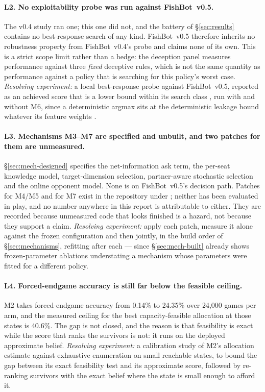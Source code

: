\documentclass[11pt]{article}
\theoremstyle{definition}
\DeclareRobustCommand{\vfive}{\texorpdfstring{\mbox{FishBot v0.5}}{FishBot v0.5}}
\DeclareRobustCommand{\vfour}{\texorpdfstring{\mbox{FishBot v0.4}}{FishBot v0.4}}
\providecommand{\numFeasibleRight}{40.6}
\providecommand{\numVfiveForcedAcc}{24.35}
\providecommand{\numVfourForcedAcc}{0.14}
\providecommand{\numForcedEightGames}{24{,}000}
\begin{document}
\paragraph{L2. No exploitability probe was run against \vfive{}.} The v0.4 study
ran one; this one did not, and the battery of \S\ref{sec:results} contains no
best-response search of any kind. \vfive{} therefore inherits no robustness
property from \vfour{}'s probe and claims none of its own. This is a strict
scope limit rather than a hedge: the deception panel measures performance against
three \emph{fixed} deceptive rules, which is not the same quantity as
performance against a policy that is searching for this policy's worst case.
\emph{Resolving experiment:} a local best-response probe against \vfive{},
reported as an achieved score that is a lower bound within its search class
\cite{lisy-lbr}, run with and without M6, since a deterministic argmax sits at
the deterministic leakage bound whatever its feature weights
\cite{alvim-leakage}.

\paragraph{L3. Mechanisms M3--M7 are specified and unbuilt, and two patches for
them are unmeasured.} \S\ref{sec:mech-designed} specifies the net-information ask
term, the per-seat knowledge model, target-dimension selection, partner-aware
stochastic selection and the online opponent model. None is on \vfive{}'s
decision path. Patches for M4/M5 and for M7 exist in the repository
under ; neither has been evaluated in play, and
no number anywhere in this report is attributable to either. They are recorded
because unmeasured code that looks finished is a hazard, not because they support
a claim. \emph{Resolving experiment:} apply each patch, measure it alone against
the frozen configuration and then jointly, in the build order of
\S\ref{sec:mechanisms}, refitting after each --- since
\S\ref{sec:mech-built} already shows frozen-parameter ablations understating a
mechanism whose parameters were fitted for a different policy.

\paragraph{L4. Forced-endgame accuracy is still far below the feasible
ceiling.} M2 takes forced-endgame accuracy from \numVfourForcedAcc\% to
\numVfiveForcedAcc\% over \numForcedEightGames{} games per arm, and the measured
ceiling for the best capacity-feasible allocation at those states is
\numFeasibleRight\%. The gap is not closed, and the reason is that feasibility
is exact while the score that ranks the survivors is not: it runs on the
deployed approximate belief. \emph{Resolving experiment:} a calibration study of
M2's allocation estimate against exhaustive enumeration on small reachable
states, to bound the gap between its exact feasibility test and its approximate
score, followed by re-ranking survivors with the exact belief where the state is
small enough to afford it.
\end{document}
